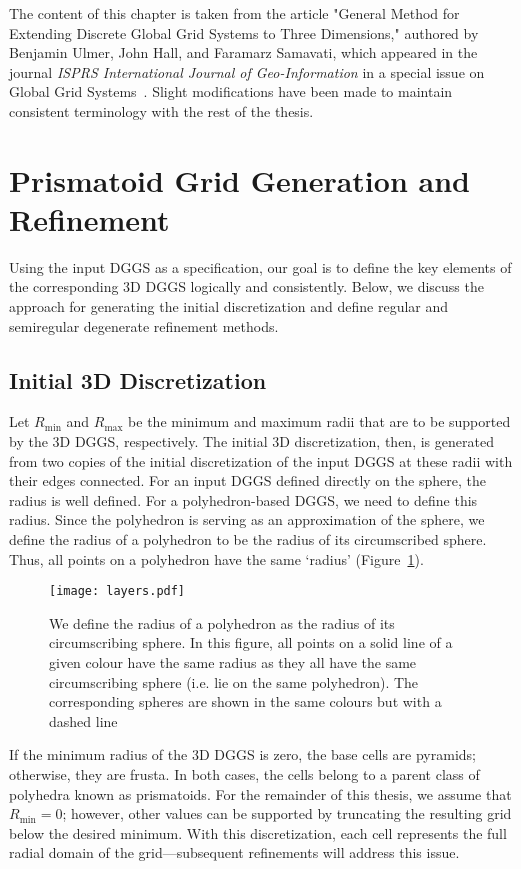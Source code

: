 The content of this chapter is taken from the article "General Method for Extending Discrete Global Grid Systems to Three Dimensions," authored by Benjamin Ulmer, John Hall, and Faramarz Samavati, which appeared in the journal \textit{ISPRS International Journal of Geo-Information} in a special issue on Global Grid Systems~\cite{ulmer2020general}.
Slight modifications have been made to maintain consistent terminology with the rest of the thesis.


\section{Prismatoid Grid Generation and Refinement} \label{chap:5:grid}
Using the input DGGS as a specification, our goal is to define the key elements of the corresponding 3D DGGS logically and consistently.
Below, we discuss the approach for generating the initial discretization and define regular and semiregular degenerate refinement methods. 


\subsection{Initial 3D Discretization} \label{chap:5:discretization}
Let $R_\mathrm{min}$ and $R_\mathrm{max}$ be the minimum and maximum radii that are to be supported by the 3D DGGS, respectively.
The initial 3D discretization, then, is generated from two copies of the initial discretization of the input DGGS at these radii with their edges connected.
For an input DGGS defined directly on the sphere, the radius is well defined.
For a polyhedron-based DGGS, we need to define this radius.
Since the polyhedron is serving as an approximation of the sphere, we define the radius of a polyhedron to be the radius of its circumscribed sphere.
Thus, all points on a polyhedron have the same `radius' (Figure~\ref{fig:layers}).


\begin{figure}[ht!]
	\centering
	\texttt{[image: layers.pdf]}
	\caption[How the radius of a polyhedron is defined]{
		We define the radius of a polyhedron as the radius of its circumscribing sphere.
		In this figure, all points on a solid line of a given colour have the same radius as they all have the same circumscribing sphere (i.e. lie on the same polyhedron).
		The corresponding spheres are shown in the same colours but with a dashed line
	}
	\label{fig:layers}
\end{figure}


If the minimum radius of the 3D DGGS is zero, the base cells are pyramids; otherwise, they are frusta.
In both cases, the cells belong to a parent class of polyhedra known as prismatoids.
For the remainder of this thesis, we assume that $R_\mathrm{min} = 0$; however, other values can be supported by truncating the resulting grid below the desired minimum.
With this discretization, each cell represents the full radial domain of the grid---subsequent refinements will address this issue.


